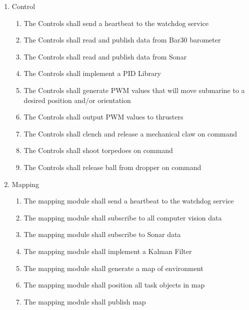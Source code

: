 \begin{enumerate}
    \item Control 
        \begin{enumerate}
            \item The Controls shall send a heartbeat to the watchdog service  
            \item The Controls shall read and publish data from Bar30 barometer 
            \item The Controls shall read and publish data from Sonar 
            \item The Controls shall implement a PID Library 
            \item The Controls shall generate PWM values that will move submarine to a desired position and/or orientation 
            \item The Controls shall output PWM values to thrusters 
            \item The Controls shall clench and release a mechanical claw on command 
            \item The Controls shall shoot torpedoes on command 
            \item The Controls shall release ball from dropper on command 
        \end{enumerate}

    \item Mapping 
        \begin{enumerate}
            \item The mapping module shall send a heartbeat to the watchdog service  
            \item The mapping module shall subscribe to all computer vision data 
            \item The mapping module shall subscribe to Sonar data 
            \item The mapping module shall implement a Kalman Filter 
            \item The mapping module shall generate a map of environment 
            \item The mapping module shall position all task objects in map 
            \item The mapping module shall publish map
        \end{enumerate}


\end{enumerate}
